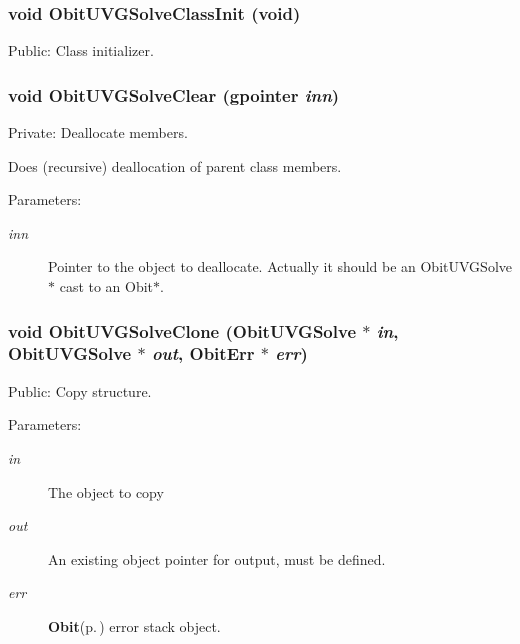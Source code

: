 \subsubsection{\setlength{\rightskip}{0pt plus 5cm}void Obit\-UVGSolve\-Class\-Init (void)}\label{ObitUVGSolve_8c_a18}


Public: Class initializer. 

\subsubsection{\setlength{\rightskip}{0pt plus 5cm}void Obit\-UVGSolve\-Clear (gpointer {\em inn})}\label{ObitUVGSolve_8c_a4}


Private: Deallocate members. 

Does (recursive) deallocation of parent class members. \begin{Desc}
\item[Parameters:]
\begin{description}
\item[{\em inn}]Pointer to the object to deallocate. Actually it should be an Obit\-UVGSolve$\ast$ cast to an Obit$\ast$. \end{description}
\end{Desc}
\subsubsection{\setlength{\rightskip}{0pt plus 5cm}void Obit\-UVGSolve\-Clone ({\bf Obit\-UVGSolve} $\ast$ {\em in}, {\bf Obit\-UVGSolve} $\ast$ {\em out}, {\bf Obit\-Err} $\ast$ {\em err})}\label{ObitUVGSolve_8c_a15}


Public: Copy structure. 

\begin{Desc}
\item[Parameters:]
\begin{description}
\item[{\em in}]The object to copy \item[{\em out}]An existing object pointer for output, must be defined. \item[{\em err}]{\bf Obit}{\rm (p.\,\pageref{structObit})} error stack object. \end{description}
\end{Desc}
